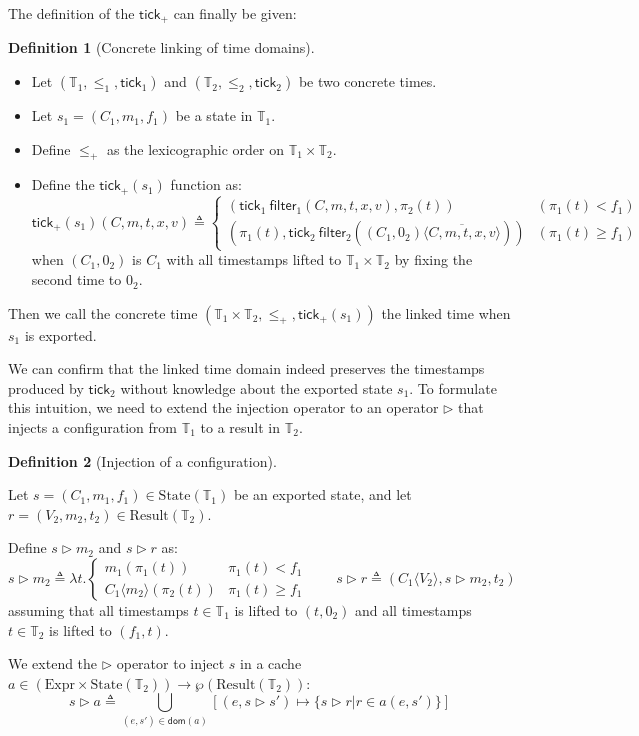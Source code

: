\documentclass[acmsmall,review]{acmart}\settopmatter{printfolios=true,printccs=false,printacmref=false}
\theoremstyle{definition}
\newtheorem{definition}{Definition}[section]
\newcommand*{\Expr}{\text{Expr}}
\newcommand*{\Time}{\mathbb{T}}
\newcommand*{\mem}{m}
\newcommand*{\State}[1]{\text{State}({#1})}
\newcommand*{\Result}[1]{\text{Result}({#1})}
\newcommand*{\tick}{\mathsf{tick}}
\newcommand*{\inject}[2]{{#1}\langle{#2}\rangle}
\newcommand*{\delete}[2]{{#1}\overline{\langle{#2}\rangle}}
\newcommand*{\filter}{\mathsf{filter}}
\begin{document}
The definition of the $\tick_+$ can finally be given:
\begin{definition}[Concrete linking of time domains]
  $\:$

  \begin{itemize}
    \item Let $(\Time_1,\le_1,\tick_1)$ and $(\Time_2,\le_2,\tick_2)$ be two concrete times.
    \item Let ${s_1}=({C_1},{\mem_1},{f_1})$ be a state in $\Time_1$.
    \item Define $\le_+$ as the lexicographic order on $\Time_1\times\Time_2$.
    \item Define the ${\tick_{+}}({s_1})$ function as:
          \[
            \tick_{+}({s_1})({C},\mem,{t},x,{v})\triangleq
            \begin{cases}
              (\tick_1\:\filter_1(C,\mem,t,x,v), \pi_2(t))                           & (\pi_1(t)<f_1)    \\
              (\pi_1(t),\tick_2\:\filter_2(\delete{{(C_1,0_2)}}{C,\mem, {t},x,{v}})) & (\pi_1(t)\ge f_1)
            \end{cases}
          \]
          when $(C_1,0_2)$ is $C_1$ with all timestamps lifted to $\Time_1\times\Time_2$ by fixing the second time to $0_2$.
  \end{itemize}

  Then we call the concrete time $(\Time_1\times\Time_2,\le_+,\tick_{+}({s_1}))$ the linked time when $s_1$ is exported.
\end{definition}

We can confirm that the linked time domain indeed preserves the timestamps produced by $\tick_2$ without knowledge about the exported state $s_1$.
To formulate this intuition, we need to extend the injection operator to an operator $\rhd$ that injects a configuration from $\Time_1$ to a result in $\Time_2$.
\begin{definition}[Injection of a configuration]
  $\:$

  Let ${s}=({C_1},{\mem_1},{f_1})\in\State{\Time_1}$ be an exported state, and let ${r}=({V_2},{\mem_2},t_2)\in\Result{\Time_2}$.

  Define $s\rhd m_2$ and $s\rhd r$ as:
  \[
    s\rhd m_2\triangleq
    \lambda t.
    \begin{cases}
      m_1(\pi_1(t))               & \pi_1(t)<f_1    \\
      \inject{C_1}{m_2}(\pi_2(t)) & \pi_1(t)\ge f_1
    \end{cases}
    \qquad
    s\rhd r\triangleq
    (\inject{C_1}{V_2},s\rhd m_2,t_2)
  \]
  assuming that all timestamps $t\in\Time_1$ is lifted to $(t,0_2)$ and all timestamps $t\in\Time_2$ is lifted to $(f_1,t)$.

  We extend the $\rhd$ operator to inject ${s}$ in a cache $a\in(\Expr\times\State{\Time_2})\rightarrow{\wp(\Result{\Time_2})}$:
  \[
    {s}\rhd{a}\triangleq\bigcup_{(e,{s'})\in\mathsf{dom}({a})}[(e,{s}\rhd{s'})\mapsto\{{s}\rhd{r}|{r}\in{a}(e,{s'})\}]
  \]
\end{definition}
\end{document}
